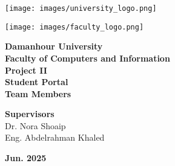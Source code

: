 \documentclass[12pt]{report}
\begin{document}

\begin{titlepage}
    \thispagestyle{empty}

    \begin{minipage}{0.49\textwidth}
        \raggedright
        \texttt{[image: images/university\_logo.png]}
    \end{minipage}
    \begin{minipage}{0.49\textwidth}
        \raggedleft
        \texttt{[image: images/faculty\_logo.png]}
    \end{minipage}

    \vspace{2cm}

    \begin{center}
        {\LARGE \textbf{Damanhour University}}\\[0.5em]
        {\Large \textbf{Faculty of Computers and Information}}\\[1.5cm]

        {\Large \textbf{Project II}}\\[0.5em]
        {\Huge \textbf{Student Portal}}\\[1.5cm]

        {\Large \textbf{Team Members}}\\[1em]
        \begin{center}
        \end{center}
        

        \vspace{2cm}
        {\Large \textbf{Supervisors}}\\[1em]
        Dr. Nora Shoaip\\
        Eng. Abdelrahman Khaled

        \vfill
        {\large \textbf{Jun. 2025}}
    \end{center}
\end{titlepage}
\end{document}

